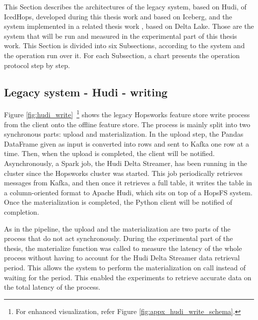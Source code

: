 This Section describes the architectures of the legacy system, based on Hudi, of IcedHops, developed during this thesis work and based on Iceberg, and the system implemented in a related thesis work \cite{manfrediReducingReadWrite2024}, based on Delta Lake. Those are the system that will be run and measured in the experimental part of this thesis work. This Section is divided into six Subsections, according to the system and the operation run over it. For each Subsection, a chart presents the operation protocol step by step.



\subsection{Legacy system - Hudi - writing}
\label{subsec:back_sys_hudi_write}

Figure \ref{fig:hudi_write}~\footnote{For enhanced visualization, refer Figure \ref{fig:appx_hudi_write_schema}.} shows the legacy Hopsworks feature store write process from the client onto the offline feature store. The process is mainly split into two synchronous parts: upload and materialization. In the upload step, the Pandas DataFrame given as input is converted into rows and sent to Kafka one row at a time. Then, when the upload is completed, the client will be notified. Asynchronously, a Spark job, the Hudi Delta Streamer, has been running in the cluster since the Hopsworks cluster was started. This job periodically retrieves messages from Kafka, and then once it retrieves a full table, it writes the table in a column-oriented format to Apache Hudi, which sits on top of a \gls{HopsFS} system. Once the materialization is completed, the Python client will be notified of completion.

As in the pipeline, the upload and the materialization are two parts of the process that do not act synchronously. During the experimental part of the thesis, the materialize function was called to measure the latency of the whole process without having to account for the Hudi Delta Streamer data retrieval period. This allows the system to perform the materialization on call instead of waiting for the period. This enabled the experiments to retrieve accurate data on the total latency of the process.

